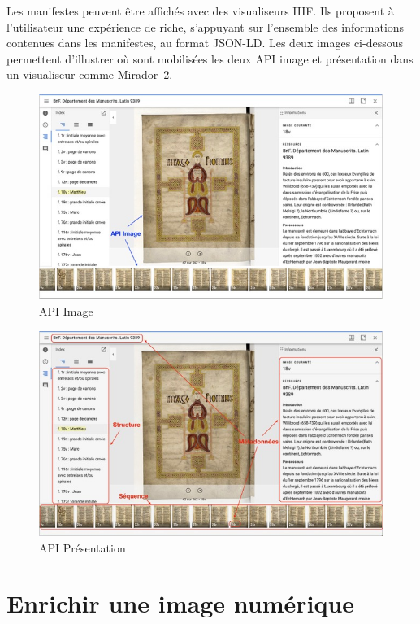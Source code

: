 Les manifestes peuvent être affichés avec des visualiseurs IIIF. Ils proposent à l’utilisateur une expérience de  riche, s’appuyant sur l’ensemble des informations contenues dans les manifestes, au format JSON-LD. Les deux images ci-dessous permettent d’illustrer où sont mobilisées les deux API image et présentation dans un visualiseur comme Mirador~2. \par

\begin{figure}[H]
	\centering
	\includegraphics[scale=0.6]{./textes/chap4/mirador-api-image.jpeg}
	\caption{API Image}
	\label{fig:info}
\end{figure}
\begin{figure}[H]
	\centering
	\includegraphics[scale=0.6]{./textes/chap4/mirador-api-presentation.jpeg}
	\caption{API Présentation}
	\label{fig:info}
\end{figure}

\newpage

\section{Enrichir une image numérique}

